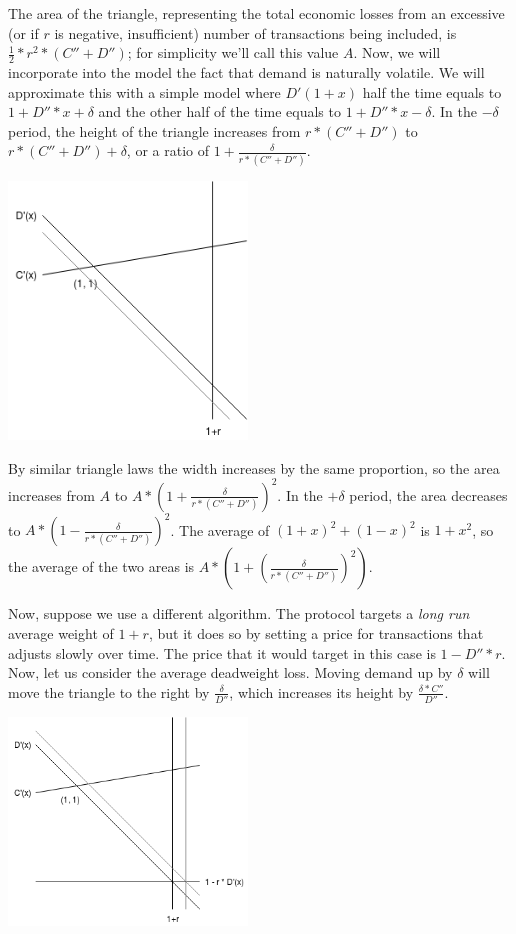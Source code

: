 \documentclass[12pt, final]{article}
\begin{document}
The area of the triangle, representing the total economic losses from an excessive (or if $r$ is negative, insufficient) number of transactions being included, is $\frac{1}{2} * r^2 * (C'' + D'')$; for simplicity we'll call this value $A$. Now, we will incorporate into the model the fact that demand is naturally volatile. We will approximate this with a simple model where $D'(1 + x)$ half the time equals to $1 + D'' * x + \delta$ and the other half of the time equals to $1 + D'' * x - \delta$. In the $-\delta$ period, the height of the triangle increases from $r * (C'' + D'')$ to $r * (C'' + D'') + \delta$, or a ratio of $1 + \frac{\delta}{r * (C'' + D'')}$.

\begin{center}
\includegraphics[width=2.5in]{Triangle2.png} \\
\end{center}

By similar triangle laws the width increases by the same proportion, so the area increases from $A$ to $A * (1 + \frac{\delta}{r * (C'' + D'')})^2$. In the $+\delta$ period, the area decreases to $A * (1 - \frac{\delta}{r * (C'' + D'')})^2$. The average of $(1+x)^2 + (1-x)^2$ is $1 + x^2$, so the average of the two areas is $A * (1 + (\frac{\delta}{r * (C'' + D'')})^2)$.

Now, suppose we use a different algorithm. The protocol targets a \emph{long run} average weight of $1 + r$, but it does so by setting a price for transactions that adjusts slowly over time. The price that it would target in this case is $1 - D'' * r$. Now, let us consider the average deadweight loss. Moving demand up by $\delta$ will move the triangle to the right by $\frac{\delta}{D''}$, which increases its height by $\frac{\delta * C''}{D''}$.

\begin{center}
\includegraphics[width=2.5in]{Triangle3.png} \\
\end{center}
\end{document}

